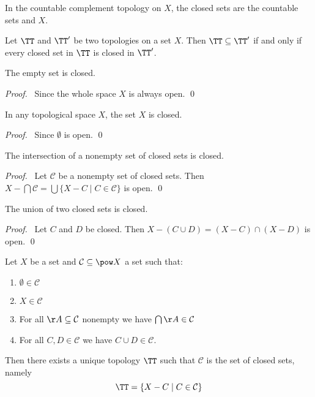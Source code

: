 \begin{proposition}
    In the countable complement topology on $X$, the closed sets are the countable sets and $X$.
\end{proposition}

\begin{proposition}
    Let $\TT$ and $\TT'$ be two topologies on a set $X$. Then $\TT \subseteq \TT'$ if and only if every closed set in $\TT$
    is closed in $\TT'$.
\end{proposition}

\begin{lemma}
    The empty set is closed.
\end{lemma}

\begin{proof}
    \pf\ Since the whole space $X$ is always open. \qed
\end{proof}

\begin{lemma}
    \label{lemma:closed_whole_set}
    In any topological space $X$, the set $X$ is closed.
\end{lemma}

\begin{proof}
    \pf\ Since $\emptyset$ is open. \qed
\end{proof}

\begin{lemma}
    \label{lemma:closed_intersection}
    The intersection of a nonempty set of closed sets is closed.
\end{lemma}

\begin{proof}
    \pf\ Let $\mathcal{C}$ be a nonempty set of closed sets. Then $X - \bigcap \mathcal{C}
    = \bigcup \{ X - C \mid C \in \mathcal{C} \}$ is open. \qed
\end{proof}

\begin{lemma}
    \label{lemma:closed_union}
    The union of two closed sets is closed.
\end{lemma}

\begin{proof}
    \pf\ Let $C$ and $D$ be closed. Then $X - (C \cup D) = (X - C) \cap (X - D)$
    is open. \qed
\end{proof}

\begin{proposition}
    Let $X$ be a set and $\mathcal{C} \subseteq \pow X$ a set such that:
    \begin{enumerate}
        \item $\emptyset \in \mathcal{C}$
        \item $X \in \mathcal{C}$
        \item For all $\AA \subseteq \mathcal{C}$ nonempty we have $\bigcap \AA \in \mathcal{C}$
        \item For all $C, D \in \mathcal{C}$ we have $C \cup D \in \mathcal{C}$.
    \end{enumerate}
    Then there exists a unique topology $\TT$ such that $\mathcal{C}$ is the set of closed sets, namely
    \[ \TT = \{ X - C \mid C \in \mathcal{C} \} \]
\end{proposition}


